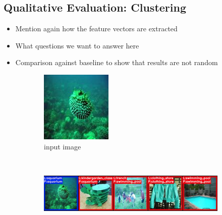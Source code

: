 \subsection{Qualitative Evaluation: Clustering}

\begin{itemize}
\item Mention again how the feature vectors are extracted
\item What questions we want to answer here
\item Comparison against baseline to show that results are not random
\end{itemize}

\begin{figure}[htb]
\centering
  \begin{subfigure}[b]{.24\linewidth}
    \centering
    \includegraphics[width=.99\textwidth]{figures/clustering/aquarium}
    \caption{input image}\label{fig:clustering_aquarium_input}
  \end{subfigure}  \\%
  \begin{subfigure}[b]{.99\linewidth}
    \centering
    \includegraphics[width=.99\textwidth]{figures/clustering/aquarium_conv1_avg}

\end{subfigure}
\end{figure}
